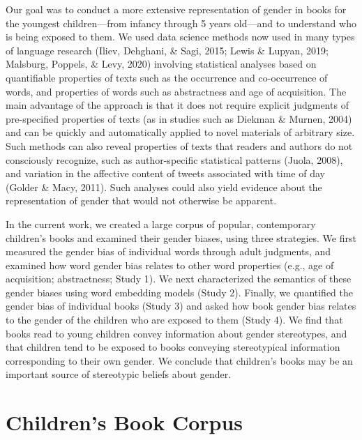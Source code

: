 \documentclass[english,,man,floatsintext]{apa6}
\begin{document}
Our goal was to conduct a more extensive representation of gender in books for the youngest children---from infancy through 5 years old---and to understand who is being exposed to them. We used data science methods now used in many types of language research (Iliev, Dehghani, \& Sagi, 2015; Lewis \& Lupyan, 2019; Malsburg, Poppels, \& Levy, 2020) involving statistical analyses based on quantifiable properties of texts such as the occurrence and co-occurrence of words, and properties of words such as abstractness and age of acquisition. The main advantage of the approach is that it does not require explicit judgments of pre-specified properties of texts (as in studies such as Diekman \& Murnen, 2004) and can be quickly and automatically applied to novel materials of arbitrary size. Such methods can also reveal properties of texts that readers and authors do not consciously recognize, such as author-specific statistical patterns (Juola, 2008), and variation in the affective content of tweets associated with time of day (Golder \& Macy, 2011). Such analyses could also yield evidence about the representation of gender that would not otherwise be apparent.

In the current work, we created a large corpus of popular, contemporary children's books and examined their gender biases, using three strategies. We first measured the gender bias of individual words through adult judgments, and examined how word gender bias relates to other word properties (e.g., age of acquisition; abstractness; Study 1). We next characterized the semantics of these gender biases using word embedding models (Study 2). Finally, we quantified the gender bias of individual books (Study 3) and asked how book gender bias relates to the gender of the children who are exposed to them (Study 4). We find that books read to young children convey information about gender stereotypes, and that children tend to be exposed to books conveying stereotypical information corresponding to their own gender. We conclude that children's books may be an important source of stereotypic beliefs about gender.

\hypertarget{childrens-book-corpus}{%
\section{Children's Book Corpus}\label{childrens-book-corpus}}
\end{document}
